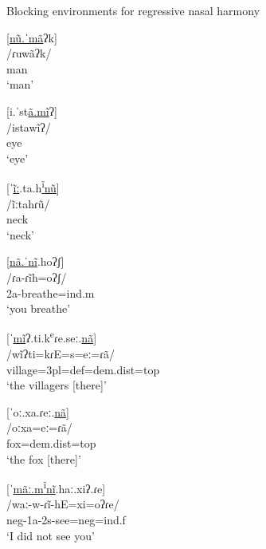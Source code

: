 \begin{exe}
\item\label{secondnasals} Blocking environments for regressive nasal harmony

	\begin{xlist}
	\item\label{secondnasals1}
	\glll \textnormal{[\uline{nũ.ˈmã}ʔk]}\\
	/ɾuwãʔk/\\
	\textnormal{man}\\
	\glt `man'

	\item\label{secondnasals2}
	\glll \textnormal{[i.ˈst\uline{ã.mĩ}ʔ]}\\
	 /istawĩʔ/\\
	\textnormal{eye}\\
	\glt `eye'

	\item\label{secondnasals3}
	\glll \textnormal{[ˈ\uline{ĩː}.ta.h\uline{\textsuperscript{ĩ}nũ}]}\\
	/ĩːtahɾũ/\\
	\textnormal{neck}\\
	\glt `neck'

	\item\label{secondnasals4}
	\glll \textnormal{[\uline{nã.ˈnĩ}.hoʔʃ]}\\
	 /ɾa-ɾĩh=oʔʃ/\\
	 2a-\textnormal{breathe}=ind.m\\
	 \glt `you breathe' \citep[181]{hollow1970}

	\item\label{secondnasals5}
	\glll \textnormal{[ˈ\uline{mĩ}ʔ.ti.k\textsuperscript{e}ɾe.seː.\uline{nã}]}\\
	/wĩʔti=kɾE=s=eː=ɾã/\\
	\textnormal{village}=3pl=def=dem.dist=top\\
	\glt `the villagers [there]' \citep[313]{hollow1973b}

	\item\label{secondnasals6}
	\glll \textnormal{[ˈoː.xa.ɾeː.\uline{nã}]}\\
	/oːxa=eː=ɾã/\\
	\textnormal{fox}=dem.dist=top\\
	\glt `the fox [there]' \citep[63]{hollow1973b}


	\item\label{secondnasals7}
	\glll \textnormal{[ˈ\uline{mãː.m\textsuperscript{ĩ}nĩ}.haː.xiʔ.ɾe]}\\
	/waː-w-ɾĩ-hE=xi=oʔɾe/\\
	neg-1a-2s-\textnormal{see}=neg=ind.f\\
	\glt `I did not see you' \citep[72]{hollow1973a}


\end{xlist}
\end{exe}
